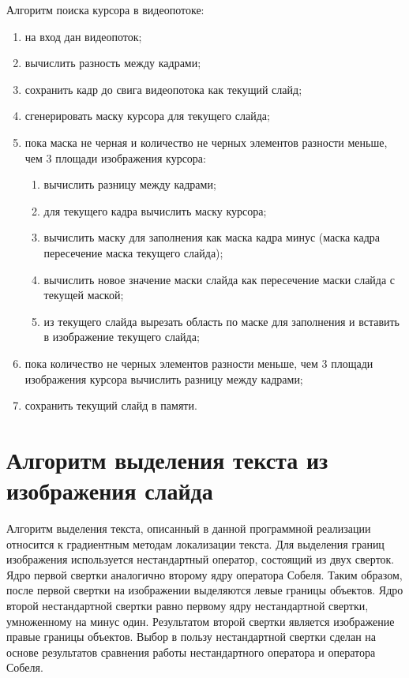 \documentclass[oneside,final,14pt]{extreport}
\begin{document}
Алгоритм поиска курсора в видеопотоке:

\begin{enumerate}
\item на вход дан видеопоток;
\item вычислить  разность между кадрами;
\item сохранить кадр до свига видеопотока как текущий слайд;
\item сгенерировать маску курсора для текущего слайда;
\item пока маска не черная и количество не черных элементов разности меньше, чем 3 площади изображения курсора:
\begin{enumerate}
	\item вычислить разницу между кадрами;
	\item для текущего кадра вычислить маску курсора;
	\item вычислить маску для заполнения как маска кадра минус (маска кадра пересечение маска текущего слайда);
	\item вычислить новое значение маски слайда как пересечение маски слайда с текущей маской;
	\item из текущего слайда вырезать область по маске для заполнения и вставить в изображение текущего слайда;
\end{enumerate}
\item пока количество не черных элементов разности меньше, чем 3 площади изображения курсора вычислить разницу между кадрами;
\item сохранить текущий слайд в памяти.
\end{enumerate}


\section{Алгоритм выделения текста из изображения слайда}
Алгоритм выделения текста, описанный в данной программной реализации относится к градиентным методам локализации текста. Для выделения границ изображения используется нестандартный оператор, состоящий из двух сверток. Ядро первой свертки аналогично второму ядру оператора Собеля. Таким образом, после первой свертки на изображении выделяются левые границы объектов. Ядро второй нестандартной свертки равно первому ядру нестандартной свертки, умноженному на минус один. Результатом второй свертки является изображение правые границы объектов. Выбор в пользу нестандартной свертки сделан на основе результатов сравнения работы нестандартного оператора и оператора Собеля.
\end{document}
